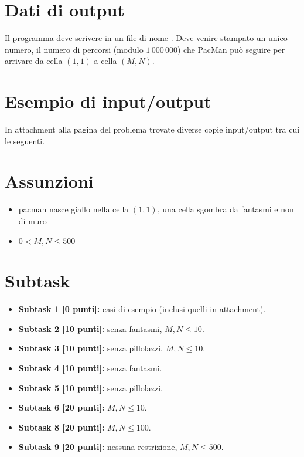\section*{Dati di output}
Il programma deve scrivere in un file di nome . Deve venire stampato un unico numero, il numero di percorsi (modulo $1\, 000\, 000$) che PacMan può seguire per arrivare da cella $(1,1)$ a cella $(M,N)$.


\section*{Esempio di input/output}

In attachment alla pagina del problema trovate diverse copie input/output tra cui le seguenti.

\vspace{0.5cm}


\section*{Assunzioni}
\begin{itemize}
\item pacman nasce giallo nella cella $(1, 1)$, una cella sgombra da fantasmi e non di muro
\item $0 < M,N \le 500$
\end{itemize}

\section*{Subtask}
\begin{itemize}
\item \textbf{Subtask 1 [0 punti]:} casi di esempio (inclusi quelli in attachment).
\item \textbf{Subtask 2 [10 punti]:} senza fantasmi, $M,N \le 10$.
\item \textbf{Subtask 3 [10 punti]:} senza pillolazzi, $M,N \le 10$.
\item \textbf{Subtask 4 [10 punti]:} senza fantasmi.
\item \textbf{Subtask 5 [10 punti]:} senza pillolazzi.
\item \textbf{Subtask 6 [20 punti]:} $M,N \le 10$.
\item \textbf{Subtask 8 [20 punti]:} $M,N \le 100$.
\item \textbf{Subtask 9 [20 punti]:} nessuna restrizione, $M,N \le 500$.
\end{itemize}



